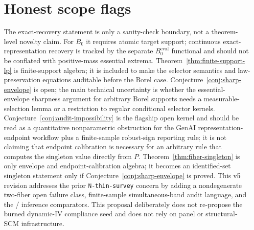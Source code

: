 \documentclass[11pt]{article}
\theoremstyle{definition}
\theoremstyle{plain}
\theoremstyle{remark}
\begin{document}
\section{Honest scope flags}
The exact-recovery statement is only a sanity-check boundary, not a theorem-level novelty claim.  For \(B_0\) it requires atomic target support; continuous exact-representation recovery is tracked by the separate \(B^{\mathrm{eval}}_0\) functional and should not be conflated with positive-mass essential extrema.  Theorem~\ref{thm:finite-support-lp} is finite-support algebra; it is included to make the selector semantics and law-preservation equations auditable before the Borel case.  Conjecture~\ref{conj:sharp-envelope} is open; the main technical uncertainty is whether the essential-envelope sharpness argument for arbitrary Borel supports needs a measurable-selection lemma or a restriction to regular conditional selector kernels.  Conjecture~\ref{conj:audit-impossibility} is the flagship open kernel and should be read as a quantitative nonparametric obstruction for the GenAI representation-endpoint workflow plus a finite-sample robust-sign reporting rule; it is not claiming that endpoint calibration is necessary for an arbitrary rule that computes the singleton value directly from \(P\).  Theorem~\ref{thm:fiber-singleton} is only envelope and endpoint-calibration algebra; it becomes an identified-set singleton statement only if Conjecture~\ref{conj:sharp-envelope} is proved.  This v5 revision addresses the prior \texttt{N-thin-survey} concern by adding a nondegenerate two-fiber open failure class, finite-sample simultaneous-band audit language, and the \citet{ImbensManski2004}/\citet{Stoye2009} inference comparators.  This proposal deliberately does not re-propose the burned dynamic-IV compliance seed and does not rely on panel or structural-SCM infrastructure.
\end{document}
